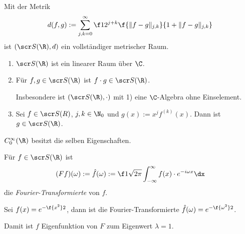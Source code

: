 \begin{nt} \label{4.3}
	Mit der Metrik
	\[
		d(f,g) := \sum_{j,k = 0}^\infty \f 1{2^{j+k}} \f {\|f-g\|_{j,k}}{1+ \|f-g\|_{j,k}}
	\]
	ist $(\scr S(\R), d)$ ein vollständiger metrischer Raum.
\end{nt}

\begin{nt}[Eigenschaften] \label{4.4}
	\begin{enumerate}[1)]
		\item
			$\scr S(\R)$ ist ein linearer Raum über $\C$.
		\item
			Für $f,g \in \scr S (\R)$ ist $f \cdot g \in \scr S(\R)$.

			Insbesondere ist $(\scr S(\R), \cdot)$ mit 1) eine $\C$-Algebra ohne Einselement.
		\item
			Sei $f \in \scr S(R)$, $j,k \in \N_0$ und $g(x) := x^j f^{(k)}(x)$.
			Dann ist $g \in \scr S(\R)$.
	\end{enumerate}
	$C_0^\infty(\R)$ besitzt die selben Eigenschaften.
\end{nt}

\begin{df} \label{4.5}
	Für $f \in \scr S (\R)$ ist
	\[
		(Ff)(\omega) := \hat f(\omega) := \f 1{\sqrt{2\pi}} \int_{-\infty}^\infty f(x) \cdot e^{-i\omega x} \dx
	\]
	die \emph{Fourier-Transformierte} von $f$.
\end{df}

\begin{ex} \label{4.6}
	Sei $f(x) = e^{-\f {x^2}2}$, dann ist die Fourier-Transformierte $\hat f(\omega) = e^{-\f {\omega^2}2}$.

	Damit ist $f$ Eigenfunktion von $F$ zum Eigenwert $\lambda = 1$.
\end{ex}

